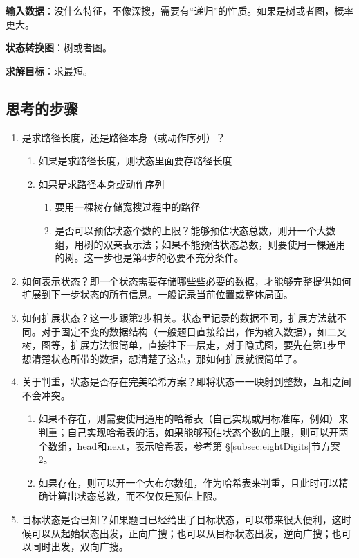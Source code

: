 \textbf{输入数据}：没什么特征，不像深搜，需要有“递归”的性质。如果是树或者图，概率更大。

\textbf{状态转换图}：树或者图。

\textbf{求解目标}：求最短。


\subsection{思考的步骤}
\begin{enumerate}
\item 是求路径长度，还是路径本身（或动作序列）？
    \begin{enumerate}
    \item 如果是求路径长度，则状态里面要存路径长度
    \item 如果是求路径本身或动作序列
        \begin{enumerate}
            \item 要用一棵树存储宽搜过程中的路径
            \item 是否可以预估状态个数的上限？能够预估状态总数，则开一个大数组，用树的双亲表示法；如果不能预估状态总数，则要使用一棵通用的树。这一步也是第4步的必要不充分条件。
        \end{enumerate}
    \end{enumerate}

\item 如何表示状态？即一个状态需要存储哪些些必要的数据，才能够完整提供如何扩展到下一步状态的所有信息。一般记录当前位置或整体局面。

\item 如何扩展状态？这一步跟第2步相关。状态里记录的数据不同，扩展方法就不同。对于固定不变的数据结构（一般题目直接给出，作为输入数据），如二叉树，图等，扩展方法很简单，直接往下一层走，对于隐式图，要先在第1步里想清楚状态所带的数据，想清楚了这点，那如何扩展就很简单了。

\item 关于判重，状态是否存在完美哈希方案？即将状态一一映射到整数，互相之间不会冲突。
    \begin{enumerate}
    \item 如果不存在，则需要使用通用的哈希表（自己实现或用标准库，例如）来判重；自己实现哈希表的话，如果能够预估状态个数的上限，则可以开两个数组，head和next，表示哈希表，参考第 \S \ref{subsec:eightDigits}节方案2。
    \item 如果存在，则可以开一个大布尔数组，作为哈希表来判重，且此时可以精确计算出状态总数，而不仅仅是预估上限。
    \end{enumerate}

\item 目标状态是否已知？如果题目已经给出了目标状态，可以带来很大便利，这时候可以从起始状态出发，正向广搜；也可以从目标状态出发，逆向广搜；也可以同时出发，双向广搜。
\end{enumerate}


